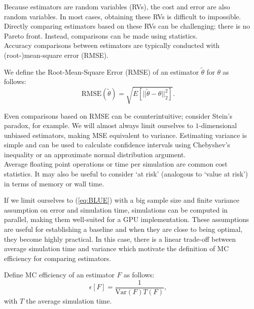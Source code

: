 \documentclass[a4paper,12pt]{article}
\begin{document}
Because estimators are random variables (RVs), the cost and error are also random
variables. In most cases, obtaining these RVs is difficult to impossible.
Directly comparing estimators based on these RVs can be challenging;
there is no Pareto front. Instead, comparisons can be made
using statistics. \\

Accuracy comparisons between estimators
are typically conducted with (root-)mean-square error (RMSE).
\begin{definition}
    We define the Root-Mean-Square Error (RMSE) of an estimator $\tilde{\theta}$ for $\theta$  as follows:
    \begin{equation}
        \text{RMSE}(\tilde{\theta}) = \sqrt{E[||\tilde{\theta}-\theta||^{2}_{2}]}.
    \end{equation}
\end{definition}

Even comparisons based on RMSE can be counterintuitive; consider Stein's paradox,
for example. We will almost always limit ourselves to $1$-dimensional
unbiased estimators, making MSE equivalent to variance.
Estimating variance is simple and can be used to calculate
confidence intervals using Chebyshev's inequality or an
approximate normal distribution argument.\\

Average floating point operations or time per simulation are common cost statistics.
It may also be useful to consider \enquote*{at risk}  (analogous to \enquote*{value at risk})
in terms of memory or wall time.

If we limit ourselves to (\ref{eq:BLUE}) with a big sample size and
finite variance assumption on error and simulation time,
simulations can be computed in parallel, making them well-suited for a GPU implementation.
These assumptions are useful for establishing a baseline and
when they are close to being optimal, they become highly practical.
In this case, there is a linear trade-off
between average simulation time and variance which motivate
the definition of MC efficiency for comparing estimators.

\begin{definition}
    Define MC efficiency of an
    estimator $F$ as follows:
    \begin{equation}
        \epsilon[F]=\frac{1}{\text{Var}(F) T(F)},
    \end{equation}
    with $T$ the average simulation time.
\end{definition}
\end{document}

